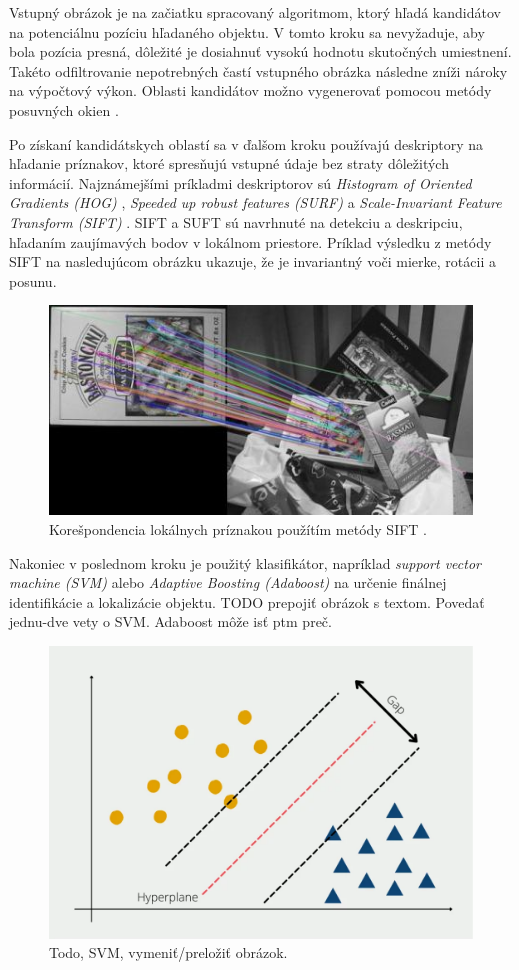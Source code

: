 Vstupný obrázok je na začiatku spracovaný algoritmom, ktorý hľadá kandidátov na potenciálnu pozíciu hľadaného objektu. V tomto kroku sa nevyžaduje, aby bola pozícia presná, dôležité je dosiahnuť vysokú hodnotu skutočných umiestnení. Takéto odfiltrovanie nepotrebných častí vstupného obrázka následne zníži nároky na výpočtový výkon. Oblasti kandidátov možno vygenerovať pomocou metódy posuvných okien \cite{sel-search}.

Po získaní kandidátskych oblastí sa v ďalšom kroku používajú deskriptory na hľadanie príznakov, ktoré spresňujú vstupné údaje bez straty dôležitých informácií. Najznámejšími príkladmi deskriptorov sú \textit{Histogram of Oriented Gradients (HOG)} \cite{HOG}, \textit{Speeded up robust features (SURF)} \cite{SURF} a \textit{Scale-Invariant Feature Transform (SIFT)} \cite{SIFT}. SIFT a SUFT sú navrhnuté na detekciu a deskripciu, hľadaním zaujímavých bodov v lokálnom priestore. Príklad výsledku z metódy SIFT na nasledujúcom obrázku ukazuje, že je invariantný voči mierke, rotácii a posunu.

\begin{figure}[H]
    \centering
    \includegraphics[width=.6\textwidth]{images/01/sift.jpeg}
    \caption{Korešpondencia lokálnych príznakou použítím metódy SIFT \cite{sift-img}.}
    \label{img:sift}
\end{figure}

Nakoniec v poslednom kroku je použitý klasifikátor, napríklad \textit{support vector machine (SVM)} \cite{SVM} alebo \textit{Adaptive Boosting (Adaboost)} \cite{Adaboost} na určenie finálnej identifikácie a lokalizácie objektu.
TODO prepojiť obrázok s textom. Povedať jednu-dve vety o SVM. Adaboost môže isť ptm preč.
\begin{figure}[H]
    \centering
    \includegraphics[width=.6\textwidth]{images/01/svm.png}
    \caption{Todo, SVM, vymeniť/preložiť obrázok.}
    \label{img:svm}
\end{figure}

